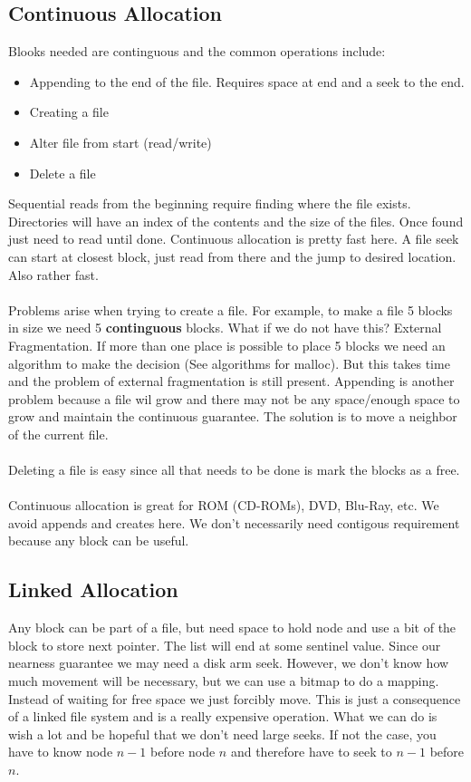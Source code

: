 \documentclass[../base_file/cs1550_notes.tex]{subfiles}
\begin{document}
\subsection{Continuous Allocation}
Blooks needed are continguous and the common operations include:
\begin{itemize}
	\item Appending to the end of the file.  Requires space at end
		and a seek to the end.
	\item Creating a file
	\item Alter file from start (read/write)
	\item Delete a file
\end{itemize}
Sequential reads from the beginning require finding where the file
exists.  Directories will have an index of the contents and the size
of the files.  Once found just need to read until done.  Continuous
allocation is pretty fast here.  A file seek can start at closest
block, just read from there and the jump to desired location.  Also
rather fast.\\\\
Problems arise when trying to create a file.  For example, to make a
file 5 blocks in size we need 5 \textbf{continguous} blocks.  What if
we do not have this? External Fragmentation.  If more than one place
is possible to place 5 blocks we need an algorithm to make the decision
(See algorithms for malloc).  But this takes time and the problem of 
external fragmentation is still present.  Appending is another problem
because a file wil grow and there may not be any space/enough space to
grow and maintain the continuous guarantee. The solution is to move a 
neighbor of the current file.\\\\
Deleting a file is easy since all that needs to be done is mark the
blocks as a free.\\\\
Continuous allocation is great for ROM (CD-ROMs), DVD, Blu-Ray, etc. We
avoid appends and creates here.  We don't necessarily need contigous
requirement because any block can be useful.
\subsection{Linked Allocation}
Any block can be part of a file, but need space to hold node and use a
bit of the block to store next pointer.  The list will end at some
sentinel value.  Since our nearness guarantee we may need a disk
arm seek.  However, we don't know how much movement will be necessary,
but we can use a bitmap to do a mapping.  Instead of waiting for free
space we just forcibly move.  This is just a consequence of a linked
file system and is a really expensive operation.  What we can do is 
wish a lot and  be hopeful that we don't need large seeks.  If not
the case, you have to know node $n-1$ before node $n$ and therefore
have to seek to $n-1$ before $n$.
\end{document}
